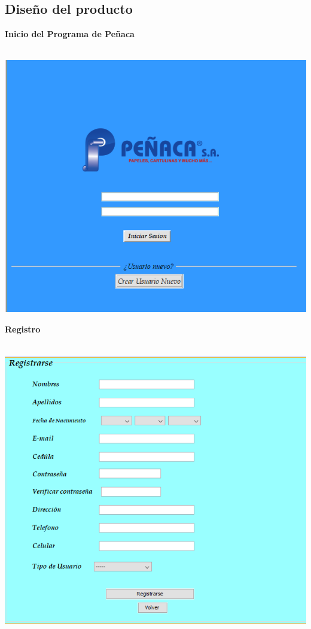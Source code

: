 \documentclass[12pt,a4paper]{article}
\begin{document}
\subsection{Diseño del producto}
\par\vspace{0.5cm}
\textbf {Inicio del Programa de Peñaca}\\\\
\begin{center}
\includegraphics[scale=0.7]{inicio.png}
\end{center}
\par\vspace{1cm}
\textbf {Registro}\\\\
\begin{center}
 \includegraphics[scale=0.7]{registro.png}
 \end{center} 
\end{document}
